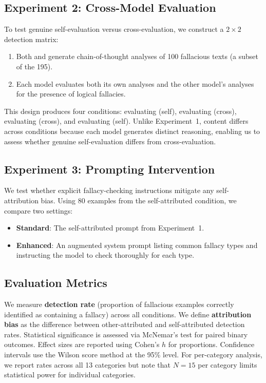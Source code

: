 \subsection{Experiment 2: Cross-Model Evaluation}
\label{sec:exp2}

To test genuine self-evaluation versus cross-evaluation, we construct a $2 \times 2$ detection matrix:

\begin{enumerate}[leftmargin=*,itemsep=2pt,topsep=2pt]
    \item Both \gptfull and \gptmini generate chain-of-thought analyses of 100 fallacious texts (a subset of the 195).
    \item Each model evaluates both its own analyses and the other model's analyses for the presence of logical fallacies.
\end{enumerate}

This design produces four conditions: \gptfull evaluating \gptfull (self), \gptfull evaluating \gptmini (cross), \gptmini evaluating \gptfull (cross), and \gptmini evaluating \gptmini (self). Unlike Experiment~1, content differs across conditions because each model generates distinct reasoning, enabling us to assess whether genuine self-evaluation differs from cross-evaluation.

\subsection{Experiment 3: Prompting Intervention}
\label{sec:exp3}

We test whether explicit fallacy-checking instructions mitigate any self-attribution bias. Using 80 examples from the self-attributed condition, we compare two settings:

\begin{itemize}[leftmargin=*,itemsep=2pt,topsep=2pt]
    \item \textbf{Standard}: The self-attributed prompt from Experiment~1.
    \item \textbf{Enhanced}: An augmented system prompt listing common fallacy types and instructing the model to check thoroughly for each type.
\end{itemize}

\subsection{Evaluation Metrics}
\label{sec:metrics}

We measure \textbf{detection rate} (proportion of fallacious examples correctly identified as containing a fallacy) across all conditions. We define \textbf{attribution bias} as the difference between other-attributed and self-attributed detection rates. Statistical significance is assessed via McNemar's test for paired binary outcomes. Effect sizes are reported using Cohen's $h$ for proportions. Confidence intervals use the Wilson score method at the 95\% level. For per-category analysis, we report rates across all 13 categories but note that $N = 15$ per category limits statistical power for individual categories.

